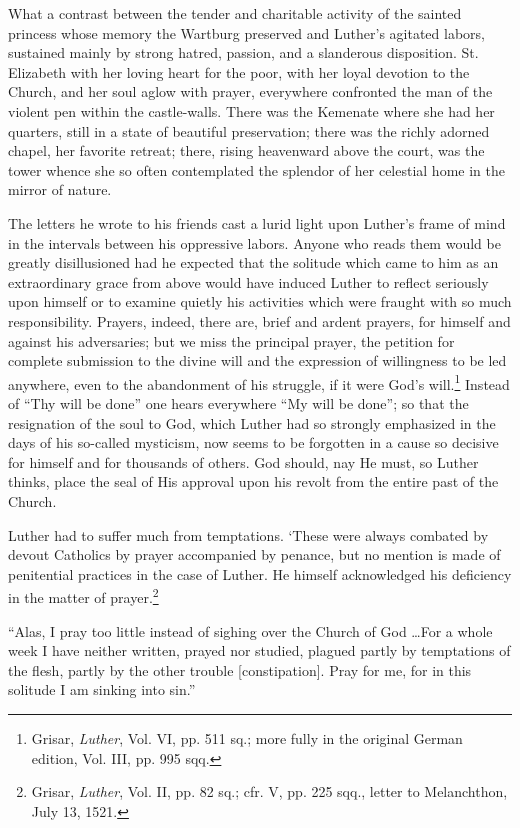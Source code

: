 What a contrast between the tender and charitable activity of the
sainted princess whose memory the Wartburg preserved and Luther’s
agitated labors, sustained mainly by strong hatred, passion, and a
slanderous disposition. St. Elizabeth with her loving heart for the
poor, with her loyal devotion to the Church, and her soul aglow with
prayer, everywhere confronted the man of the violent pen within
the castle-walls. There was the Kemenate where she had her quarters,
still in a state of beautiful preservation; there was the richly adorned
chapel, her favorite retreat; there, rising heavenward above the court,
was the tower whence she so often contemplated the splendor of her
celestial home in the mirror of nature.

The letters he wrote to his friends cast a lurid light upon Luther’s
frame of mind in the intervals between his oppressive labors. Anyone
who reads them would be greatly disillusioned had he expected that
the solitude which came to him as an extraordinary grace from above
would have induced Luther to reflect seriously upon himself or to examine
quietly his activities which were fraught with so much responsibility.
Prayers, indeed, there are, brief and ardent prayers, for
himself and against his adversaries; but we miss the principal prayer,
the petition for complete submission to the divine will and the expression
of willingness to be led anywhere, even to the abandonment
of his struggle, if it were God’s will.\footnote
{Grisar, \textit{Luther}, Vol. VI, pp. 511 sq.; more fully in the original German edition, Vol.
III, pp. 995 sqq.}
Instead of “Thy will be
done” one hears everywhere “My will be done”; so that the resignation of
the soul to God, which Luther had so strongly emphasized in
the days of his so-called mysticism, now seems to be forgotten in a
cause so decisive for himself and for thousands of others. God should,
nay He must, so Luther thinks, place the seal of His approval upon
his revolt from the entire past of the Church.

Luther had to suffer much from temptations. ‘These were always
combated by devout Catholics by prayer accompanied by penance,
but no mention is made of penitential practices in the case of Luther.
He himself acknowledged his deficiency in the matter of prayer.\footnote
{Grisar, \textit{Luther}, Vol. II, pp. 82 sq.; cfr. V, pp. 225 sqq., letter to Melanchthon, July
13, 1521.}

“Alas, I pray too little instead of sighing over the Church of God \dots For
a whole week I have neither written, prayed nor studied, plagued
partly by temptations of the flesh, partly by the other trouble [constipation].
Pray for me, for in this solitude I am sinking into sin.”

